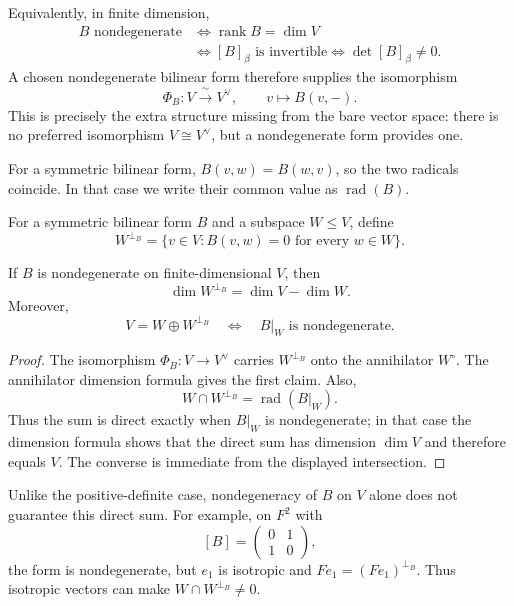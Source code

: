 Equivalently, in finite dimension,
\[
\begin{aligned}
B\text{ nondegenerate}
&\Longleftrightarrow \operatorname{rank}B=\dim V\\
&\Longleftrightarrow [B]_\beta\text{ is invertible}
\Longleftrightarrow \det[B]_\beta\ne0.
\end{aligned}
\]
A chosen nondegenerate bilinear form therefore supplies the isomorphism
\[
\Phi_B:V\xrightarrow{\ \sim\ }V^\vee,\qquad v\longmapsto B(v,-).
\]
This is precisely the extra structure missing from the bare vector space:
there is no preferred isomorphism \(V\cong V^\vee\), but a nondegenerate form
provides one.

For a symmetric bilinear form, \(B(v,w)=B(w,v)\), so the two radicals
coincide.  In that case we write their common value as \(\operatorname{rad}(B)\).

\begin{definition}
For a symmetric bilinear form \(B\) and a subspace \(W\leq V\), define
\[
W^{\perp_B}=\{v\in V:B(v,w)=0\text{ for every }w\in W\}.
\]
\end{definition}

\begin{proposition}
If \(B\) is nondegenerate on finite-dimensional \(V\), then
\[
\dim W^{\perp_B}=\dim V-\dim W.
\]
Moreover,
\[
V=W\oplus W^{\perp_B}
\quad\Longleftrightarrow\quad
B|_W\text{ is nondegenerate}.
\]
\end{proposition}
\begin{proof}
The isomorphism \(\Phi_B:V\to V^\vee\) carries \(W^{\perp_B}\) onto the
annihilator \(W^\circ\).  The annihilator dimension formula gives the first
claim.  Also,
\[
W\cap W^{\perp_B}=\operatorname{rad}(B|_W).
\]
Thus the sum is direct exactly when \(B|_W\) is nondegenerate; in that case
the dimension formula shows that the direct sum has dimension \(\dim V\) and
therefore equals \(V\).  The converse is immediate from the displayed
intersection.
\end{proof}

Unlike the positive-definite case, nondegeneracy of \(B\) on \(V\) alone does
not guarantee this direct sum.  For example, on \(F^2\) with
\[
[B]=\begin{pmatrix}0&1\\1&0\end{pmatrix},
\]
the form is nondegenerate, but \(e_1\) is isotropic and
\(Fe_1=(Fe_1)^{\perp_B}\).  Thus isotropic vectors can make
\(W\cap W^{\perp_B}\ne0\).

